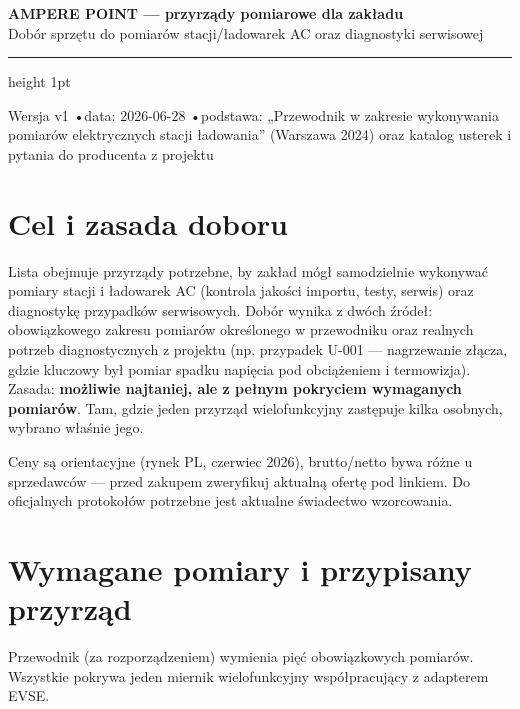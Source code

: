 \documentclass[11pt]{article}
\newcommand{\key}[1]{\textbf{\color{navy}#1}}
\begin{document}
{\sffamily\bfseries\color{navy}\LARGE AMPERE POINT — przyrządy pomiarowe dla zakładu}\\[3pt]
{\sffamily\large\color{navy} Dobór sprzętu do pomiarów stacji/ładowarek AC oraz diagnostyki serwisowej}\\[6pt]
{\color{rulegrey}\hrule height 1pt}\vspace{4pt}
{\footnotesize\sffamily Wersja v1 \quad•\quad data: 2026-06-28 \quad•\quad podstawa: „Przewodnik w zakresie wykonywania pomiarów elektrycznych stacji ładowania'' (Warszawa 2024) oraz katalog usterek i pytania do producenta z projektu}\\[2pt]

\section{Cel i zasada doboru}
Lista obejmuje przyrządy potrzebne, by zakład mógł samodzielnie wykonywać pomiary stacji i ładowarek AC (kontrola jakości importu, testy, serwis) oraz diagnostykę przypadków serwisowych. Dobór wynika z dwóch źródeł: obowiązkowego zakresu pomiarów określonego w przewodniku oraz realnych potrzeb diagnostycznych z projektu (np. przypadek U-001 — nagrzewanie złącza, gdzie kluczowy był pomiar spadku napięcia pod obciążeniem i termowizja). Zasada: \key{możliwie najtaniej, ale z pełnym pokryciem wymaganych pomiarów}. Tam, gdzie jeden przyrząd wielofunkcyjny zastępuje kilka osobnych, wybrano właśnie jego.

Ceny są orientacyjne (rynek PL, czerwiec 2026), brutto/netto bywa różne u sprzedawców — przed zakupem zweryfikuj aktualną ofertę pod linkiem. Do oficjalnych protokołów potrzebne jest aktualne świadectwo wzorcowania.

\section{Wymagane pomiary i przypisany przyrząd}
Przewodnik (za rozporządzeniem) wymienia pięć obowiązkowych pomiarów. Wszystkie pokrywa jeden miernik wielofunkcyjny współpracujący z adapterem EVSE.
\end{document}

